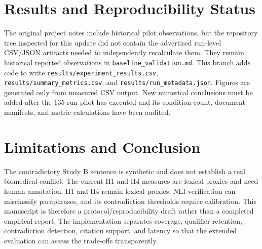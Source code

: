 \documentclass[10pt,twocolumn]{article}
\begin{document}
\section{Results and Reproducibility Status}
The original project notes include historical pilot observations, but the repository tree inspected for this update did not contain the advertised run-level CSV/JSON artifacts needed to independently recalculate them. They remain historical reported observations in \texttt{baseline\_validation.md}. This branch adds code to write \texttt{results/experiment\_results.csv}, \texttt{results/summary\_metrics.csv}, and \texttt{results/run\_metadata.json}. Figures are generated only from measured CSV output. New numerical conclusions must be added after the 135-run pilot has executed and its condition count, document manifests, and metric calculations have been audited.
\section{Limitations and Conclusion}
The contradictory Study B sentence is synthetic and does not establish a real biomedical conflict. The current H1 and H4 measures are lexical proxies and need human annotation. H1 and H4 remain lexical proxies. NLI verification can misclassify paraphrases, and its contradiction thresholds require calibration. This manuscript is therefore a protocol/reproducibility draft rather than a completed empirical report. The implementation separates coverage, qualifier retention, contradiction detection, citation support, and latency so that the extended evaluation can assess the trade-offs transparently.


\end{document}
